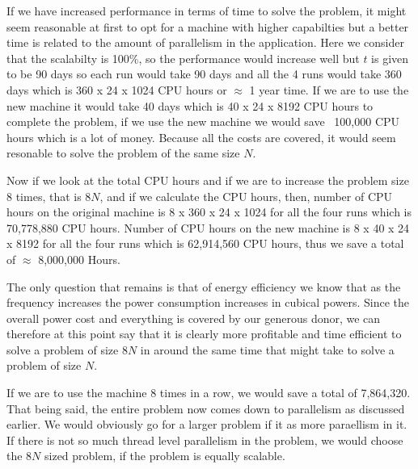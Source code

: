 \documentclass[fleqn,letterpaper,12pt]{report}
\begin{document}
If we have increased performance in terms of time to solve the problem, it might seem reasonable at first to opt for a machine with higher capabilties but a better time is related to the amount of parallelism in the application. Here we consider that the scalabilty is 100\%, so the performance would increase well but $t$ is given to be 90 days so each run  would take 90 days and all the 4 runs would take 360 days which is 360 x 24 x 1024 CPU hours or $\approx$ 1 year time. If we are to use the new machine it would take 40 days which is 40 x 24 x 8192 CPU hours to complete the problem, if we use the new machine we would save ~100,000 CPU hours which is a lot of money.  Because all the costs are covered, it would seem resonable to solve the problem of the same size $N$. 

Now if we look at the total CPU hours and if we are to increase the problem size 8 times, that is $8N$, and if we calculate the CPU hours, then, number of CPU hours on the original machine is 8 x 360 x 24 x 1024 for all the four runs which is 70,778,880 CPU hours. Number of CPU hours on the new machine is 8 x 40 x 24 x 8192 for all the four runs which is 62,914,560 CPU hours, thus we save a total of $\approx$ 8,000,000 Hours.

The only question that remains is that of energy efficiency we know that as the frequency increases the power consumption increases in cubical powers. Since the overall power cost and everything is covered by our generous donor, we can therefore at this point say that it is clearly more profitable and time efficient to solve a problem of size $8N$ in around the same time that might take to solve a problem of size $N$. 
%
\begin{table}[h!]
\centering
\caption{Comparison in terms of CPU hours for all the four runs}
\label{my-label}
\end{table}
%
If we are to use the machine 8 times in a row, we would save a total of 7,864,320. That being said, the entire problem now comes down to parallelism as discussed earlier. We would obviously go for a larger problem if it as more paraellism in it. If there is not so much thread level parallelism in the problem, we would choose the $8N$ sized problem, if the problem is equally scalable. 
\end{document}
